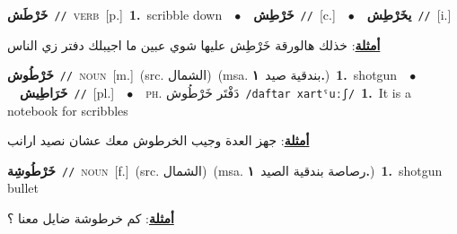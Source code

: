 \documentclass[10pt,a4paper,twoside]{article} %
\begin{document}
\begin{multicols}{2}
{\setlength\topsep{0pt}\textbf{\foreignlanguage{arabic}{خَرْطَش}}\ {\color{gray}\texttt{//}\color{black}}\ \textsc{verb}\ [p.]\ \textbf{1.}~scribble down\ \ $\bullet$\ \ \setlength\topsep{0pt}\textbf{\foreignlanguage{arabic}{خَرْطِش}}\ {\color{gray}\texttt{//}\color{black}}\ [c.]\ \ $\bullet$\ \ \setlength\topsep{0pt}\textbf{\foreignlanguage{arabic}{يخَرْطِش}}\ {\color{gray}\texttt{//}\color{black}}\ [i.]\  \begin{flushright}\color{gray}\foreignlanguage{arabic}{\textbf{\underline{\foreignlanguage{arabic}{أمثلة}}}: خذلك هالورقة خَرْطِش عليها شوي عبين ما اجيبلك دفتر زي الناس}\end{flushright}\color{black}} \vspace{2mm}

{\setlength\topsep{0pt}\textbf{\foreignlanguage{arabic}{خَرْطُوش}}\ {\color{gray}\texttt{//}\color{black}}\ \textsc{noun}\ [m.]\ (src. \color{gray}\foreignlanguage{arabic}{الشمال}\color{black})\ \color{gray}(msa. \foreignlanguage{arabic}{بندقية صيد}~\foreignlanguage{arabic}{\textbf{١.}})\color{black}\ \textbf{1.}~shotgun\ \ $\bullet$\ \ \setlength\topsep{0pt}\textbf{\foreignlanguage{arabic}{خَرَاطِيش}}\ {\color{gray}\texttt{//}\color{black}}\ [pl.]\ \ $\bullet$\ \ \textsc{ph.} \color{gray} \foreignlanguage{arabic}{دَفْتَر خَرْطُوش}\color{black}\ {\color{gray}\texttt{/{\sffamily daftar xartˤuːʃ}/}\color{black}}\ \textbf{1.}~It is a notebook for scribbles\  \begin{flushright}\color{gray}\foreignlanguage{arabic}{\textbf{\underline{\foreignlanguage{arabic}{أمثلة}}}: جهز العدة وجيب الخرطوش معك عشان نصيد ارانب}\end{flushright}\color{black}} \vspace{2mm}

{\setlength\topsep{0pt}\textbf{\foreignlanguage{arabic}{خَرْطُوشِة}}\ {\color{gray}\texttt{//}\color{black}}\ \textsc{noun}\ [f.]\ (src. \color{gray}\foreignlanguage{arabic}{الشمال}\color{black})\ \color{gray}(msa. \foreignlanguage{arabic}{رصاصة بندقية الصيد}~\foreignlanguage{arabic}{\textbf{١.}})\color{black}\ \textbf{1.}~shotgun bullet\  \begin{flushright}\color{gray}\foreignlanguage{arabic}{\textbf{\underline{\foreignlanguage{arabic}{أمثلة}}}: كم خرطوشة ضايل معنا ؟}\end{flushright}\color{black}} \vspace{2mm}


\end{multicols}
\end{document}

